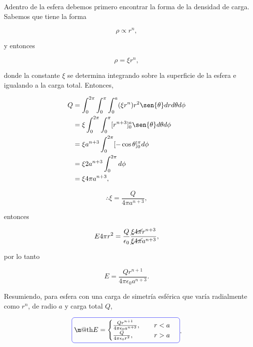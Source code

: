 \documentclass[a4paper,11pt]{article}
\makeatletter
\numberwithin{equation}{section}
\newcommand*{\boxcolor}{blue}
\renewcommand{\boxed}[1]{\textcolor{\boxcolor}{%
\tikz[baseline={([yshift=-1ex]current bounding box.center)}] \node [rectangle, minimum width=1ex,rounded corners,draw] {\normalcolor\m@th$\displaystyle#1$};}}
\makeatother
\begin{document}
Adentro de la esfera debemos primero encontrar la forma de la densidad de carga. Sabemos 
que tiene la forma 

\begin{equation}
 \rho \propto r^n,
\end{equation}

y entonces 

\begin{equation}
 \rho = \xi r^n,
\end{equation}

donde la constante $\xi$ se determina integrando sobre la superficie de la 
esfera e igualando a la carga total. Entonces, 

\begin{align*}
 Q &= \int_0^{2\pi} \int_0^\pi \int_0^a (\xi r^n) r^2 \sen{\theta}drd\theta d\phi \\
   &= \xi \int_0^{2\pi} \int_0^\pi [r^{n+3}]_0^a \sen{\theta}d\theta d\phi \\
   &= \xi a^{n+3} \int_0^{2\pi} [-\cos{\theta}]_0^\pi d\phi \\
   &= \xi 2a^{n+3} \int_0^{2\pi} d\phi \\
   &= \xi 4\pi a^{n+3},
\end{align*}

\begin{equation}
 \therefore \xi = \frac{Q}{4\pi a^{n+3}},
\end{equation}

entonces 

\begin{equation}
 E4\pi r^2 = \frac{Q}{\epsilon_0}\frac{\cancel{\xi4\pi} 
 r^{n+3}}{\cancel{\xi4\pi} a^{n+3}},
\end{equation}

por lo tanto

\begin{equation}
 E = \frac{Qr^{n+1}}{4\pi\epsilon_0a^{n+3}}.
\end{equation}

Resumiendo, para esfera con una carga de simetría esférica que varía 
radialmente como $r^n$, de radio $a$ y carga total $Q$,

\begin{equation}
\boxed{
  E =\begin{cases}
	      \frac{Qr^{n+1}}{4\pi\epsilon_0a^{n+3}}, \quad  \quad r < a \\
	      \frac{Q}{4\pi \epsilon_0 r^2}, \quad \qquad  r > a
	       \end{cases}}.
\end{equation}
\end{document}
